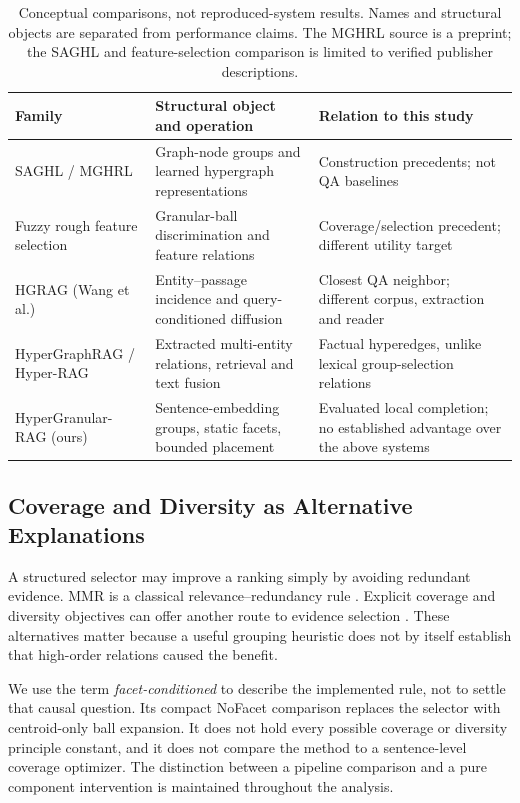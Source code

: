 \documentclass[11pt,a4paper]{article}
\begin{document}
\begin{table}[t]
\centering\small
\begin{tabular}{@{}p{}p{}p{}@{}}
\toprule
Family & Structural object and operation & Relation to this study\\
\midrule
SAGHL / MGHRL & Graph-node groups and learned hypergraph representations & Construction precedents; not QA baselines\\
Fuzzy rough feature selection & Granular-ball discrimination and feature relations & Coverage/selection precedent; different utility target\\
HGRAG (Wang et al.) & Entity--passage incidence and query-conditioned diffusion & Closest QA neighbor; different corpus, extraction and reader\\
HyperGraphRAG / Hyper-RAG & Extracted multi-entity relations, retrieval and text fusion & Factual hyperedges, unlike lexical group-selection relations\\
HyperGranular-RAG (ours) & Sentence-embedding groups, static facets, bounded placement & Evaluated local completion; no established advantage over the above systems\\
\bottomrule
\end{tabular}
\caption{Conceptual comparisons, not reproduced-system results. Names and
structural objects are separated from performance claims. The MGHRL source
is a preprint; the SAGHL and feature-selection comparison is limited to
verified publisher descriptions.}
\label{tab:neighbors}
\end{table}

\subsection{Coverage and Diversity as Alternative Explanations}
A structured selector may improve a ranking simply by avoiding redundant
evidence. MMR is a classical relevance--redundancy rule
\citep{carbonell1998mmr}. Explicit coverage and diversity objectives can offer
another route to evidence selection \citep{lin2011submodular}.
These alternatives matter because a useful grouping heuristic does not by
itself establish that high-order relations caused the benefit.

We use the term \emph{facet-conditioned} to describe the implemented rule,
not to settle that causal question. Its compact NoFacet comparison replaces
the selector with centroid-only ball expansion. It does not hold every
possible coverage or diversity principle constant, and it does not compare
the method to a sentence-level coverage optimizer. The distinction between
a pipeline comparison and a pure component intervention is maintained
throughout the analysis.
\end{document}
